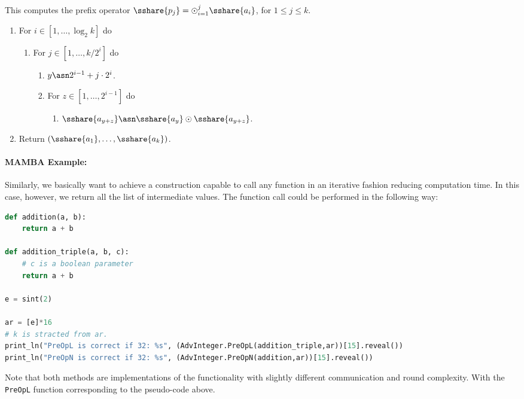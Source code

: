 This computes the prefix operator $\sshare{p_j} = \odot_{i=1}^j \sshare{a_i}$,
for $1 \le j \le k$.
\begin{enumerate}
  \item For $i \in [1,\ldots, \log_2 k]$ do
        \begin{enumerate}
          \item For $j \in [1,\ldots,k/2^i]$ do
                \begin{enumerate}
                  \item $y \asn 2^{i-1}+j\cdot 2^i$.
                  \item For $z \in [1,\ldots,2^{i-1}]$ do
                        \begin{enumerate}
                          \item $\sshare{a_{y+z}} \asn \sshare{a_y} \odot \sshare{a_{y+z}}$.
                        \end{enumerate}
                \end{enumerate}
        \end{enumerate}
  \item Return $(\sshare{a_1},\ldots,\sshare{a_k})$.
\end{enumerate}

\paragraph{MAMBA Example:} Similarly, we basically want to achieve a construction capable to call any function in an iterative fashion reducing computation time. In this case, however, we return all the list of intermediate values. The function call could be performed in the following way:
\begin{lstlisting}[language={python}]
def addition(a, b):
    return a + b

def addition_triple(a, b, c):
	# c is a boolean parameter
    return a + b

e = sint(2)

ar = [e]*16
# k is stracted from ar.
print_ln("PreOpL is correct if 32: %s", (AdvInteger.PreOpL(addition_triple,ar))[15].reveal())
print_ln("PreOpN is correct if 32: %s", (AdvInteger.PreOpN(addition,ar))[15].reveal())
\end{lstlisting}
Note that both methods are implementations of the functionality with slightly different  communication and round complexity.
With the \verb+PreOpL+ function corresponding to the pseudo-code above.

